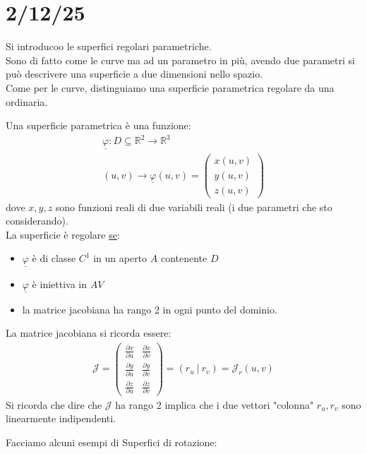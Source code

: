 \documentclass[a4paper, oneside]{article}
\begin{document}
\section{2/12/25}
Si introducoo le superfici regolari parametriche.\\
Sono di fatto come le curve ma ad un parametro in più, avendo due parametri si può descrivere una superficie a due dimensioni nello spazio.\\
Come per le curve, distinguiamo una superficie parametrica regolare da una ordinaria.\\
\begin{definition}
  Una superficie parametrica è una funzione:
  \begin{gather*}
    \underline{\varphi} : D \subseteq \mathbb{R}^2 \to \mathbb{R}^3\\
    (u,v) \to \underline{\varphi}(u,v) = \begin{pmatrix}
      x(u,v)\\
      y(u,v)\\
      z(u,v)
    \end{pmatrix}
  \end{gather*}
  dove $x,y,z$ sono funzioni reali di due variabili reali (i due parametri che sto considerando).\\
  La superficie è regolare \underline{se}:
  \begin{itemize}
    \item $\underline{\varphi}$ è di classe $C^1$ in un aperto $A$ contenente $D$
    \item $\underline{\varphi}$ è iniettiva in $AV$
    \item la matrice jacobiana ha rango 2 in ogni punto del dominio.
  \end{itemize} 
  La matrice jacobiana si ricorda essere:
  \begin{gather*}
    \mathcal{J} = \begin{pmatrix}
      \frac{\partial x}{\partial u} & \frac{\partial x}{\partial v}\\
      \frac{\partial y}{\partial u} & \frac{\partial y}{\partial v}\\
      \frac{\partial z}{\partial u} & \frac{\partial z}{\partial v}
    \end{pmatrix} = (r_u \ | \ r_v) = \mathcal{J}_r(u,v)
  \end{gather*}
  Si ricorda che dire che $\mathcal{J}$ ha rango 2 implica che i due vettori "colonna" $r_u, r_v$ sono linearmente indipendenti.
\end{definition}
\noindent Facciamo alcuni esempi di Superfici di rotazione:
\end{document}
